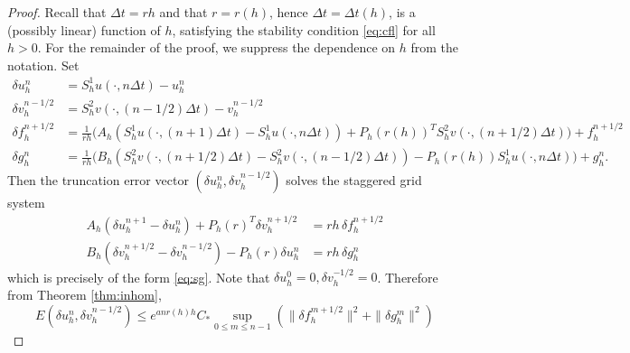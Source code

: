 \begin{proof}
Recall that $\Delta t = rh$ and that $r=r(h)$, hence $\Delta t=\Delta
t(h)$, is a (possibly linear) function of $h$, satisfying the
stability condition \ref{eq:cfl} for all $h>0$. For the remainder of
the proof, we suppress the dependence on $h$ from the notation.
Set
\begin{equation}\label{eqn:tr}
\begin{split}
  \delta u^n_h &  = S^1_hu(\cdot,n \Delta t) - u^n_h\\
  \delta v^{n-1/2}_h & = S^2_hv(\cdot,(n-1/2)\Delta t) - v^{n-1/2}_h\\
  \delta f^{n+1/2}_h & = \frac{1}{rh} \Big( A_h( S^1_h u(\cdot,(n+1)\Delta t) - S^1_h u(\cdot,n\Delta t)) + 
  P_h(r(h))^T S^2_h v(\cdot,(n+1/2)\Delta t) \Big) + f_h^{n+1/2}\\
  \delta g^{n}_h  &= \frac{1}{rh} \Big( B_h (S^2_h v(\cdot,(n+1/2)\Delta t) - S^2_h v(\cdot,(n-1/2)\Delta t) ) - 
  P_h(r(h)) S^1_h u(\cdot,n\Delta t) \Big) + g_h^{n}.
\end{split}
\end{equation}
Then the truncation error vector $(\delta u^n_h, \delta v^{n-1/2}_h)$ solves the staggered grid
system
\begin{equation}\label{eq:truncsg}
\begin{split}
  A_h(\delta u^{n+1}_h - \delta u^n_h)  + P_h(r)^T \delta
  v^{n+1/2}_h &= rh\,   \delta f_h^{n+1/2} \\
  B_h(\delta v^{n+1/2}_h-\delta v^{n-1/2}_h) -  P_h(r) \delta
  u^n_h &=  rh\, \delta g_h^{n} 
\end{split}
\end{equation}
which is precisely of the form \ref{eq:sg}. Note that $\delta u^0_h = 0,
\delta v^{-1/2}_h=0$. Therefore from Theorem
\ref{thm:inhom},
\begin{equation}
\label{eq:truncest1}
E(\delta u^n_h, \delta v^{n-1/2}_h) \le e^{anr(h)h}C_*\sup_{0 \le m
  \le n-1}(\|\delta f^{m+1/2}_h\|^2 + \|\delta g^m_h\|^2)
\end{equation}


\end{proof}
